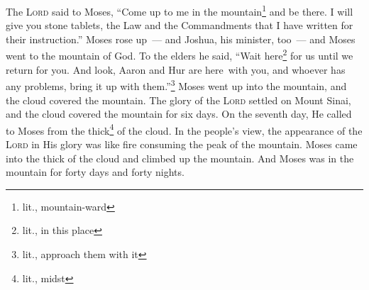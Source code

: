 \begin{inparaenum}
     The \textsc{Lord} said to Moses, ``Come up to me in the mountain\footnote{lit., mountain-ward} and be there. I will give you stone tablets, the Law and the Commandments that I have written for their instruction.''%
     Moses rose up~--- and Joshua, his minister, too~--- and Moses went to the mountain of God.%
     To the elders he said, ``Wait here\footnote{lit., in this place} for us until we return for you. And look, Aaron and Hur are here\understood\ with you, and whoever has any problems, bring it up with them.''\footnote{lit., approach them with it}%
     Moses went up into the mountain, and the cloud covered the mountain.%
     The glory of the \textsc{Lord} settled on Mount Sinai, and the cloud covered the mountain for six days. On the seventh day, He called to Moses from the thick\footnote{lit., midst} of the cloud.%
     In the people's view, the appearance of the \textsc{Lord} in His glory was like fire consuming the peak of the mountain.%
     Moses came into the thick of the cloud and climbed up the mountain. And Moses was in the mountain for forty days and forty nights.%
\end{inparaenum}
